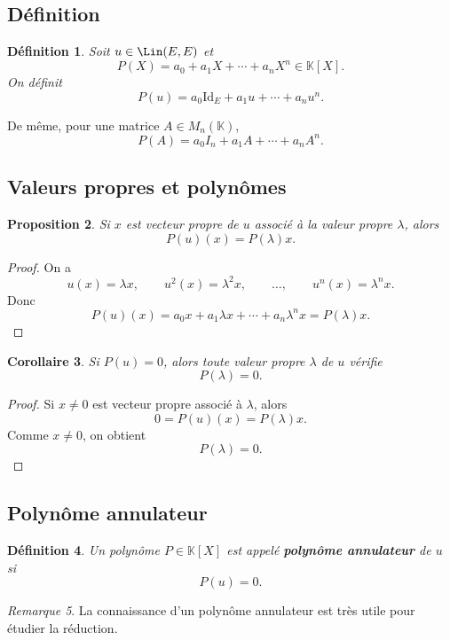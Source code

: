 \documentclass[11pt,a4paper]{article}
\newtheorem{definition}{Définition}[section]
\newtheorem{proposition}[definition]{Proposition}
\newtheorem{corollaire}[definition]{Corollaire}
\theoremstyle{remark}
\newtheorem{remarque}[definition]{Remarque}
\newcommand{\K}{\mathbb{K}}
\newcommand{\id}{\mathrm{Id}}
\begin{document}
\subsection{Définition}

\begin{definition}
Soit \(u\in\Lin(E,E)\) et
\[
P(X)=a_0+a_1X+\cdots+a_nX^n\in\K[X].
\]
On définit
\[
P(u)=a_0\id_E+a_1u+\cdots+a_nu^n.
\]
\end{definition}

De même, pour une matrice \(A\in M_n(\K)\),
\[
P(A)=a_0I_n+a_1A+\cdots+a_nA^n.
\]

\subsection{Valeurs propres et polynômes}

\begin{proposition}
Si \(x\) est vecteur propre de \(u\) associé à la valeur propre \(\lambda\), alors
\[
P(u)(x)=P(\lambda)x.
\]
\end{proposition}

\begin{proof}
On a
\[
u(x)=\lambda x,
\qquad
u^2(x)=\lambda^2x,
\qquad \dots,\qquad
u^n(x)=\lambda^n x.
\]
Donc
\[
P(u)(x)=a_0x+a_1\lambda x+\cdots+a_n\lambda^n x=P(\lambda)x.
\]
\end{proof}

\begin{corollaire}
Si \(P(u)=0\), alors toute valeur propre \(\lambda\) de \(u\) vérifie
\[
P(\lambda)=0.
\]
\end{corollaire}

\begin{proof}
Si \(x\neq 0\) est vecteur propre associé à \(\lambda\), alors
\[
0=P(u)(x)=P(\lambda)x.
\]
Comme \(x\neq 0\), on obtient
\[
P(\lambda)=0.
\]
\end{proof}

\subsection{Polynôme annulateur}

\begin{definition}
Un polynôme \(P\in\K[X]\) est appelé \textbf{polynôme annulateur} de \(u\) si
\[
P(u)=0.
\]
\end{definition}

\begin{remarque}
La connaissance d’un polynôme annulateur est très utile pour étudier la réduction.
\end{remarque}
\end{document}
